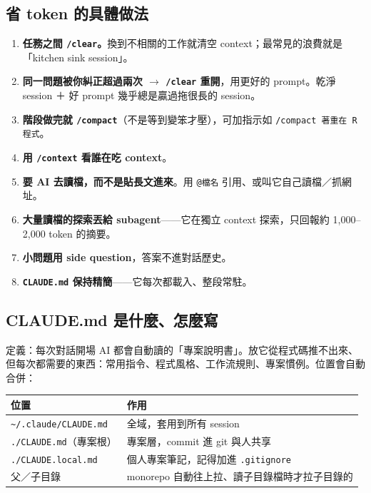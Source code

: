 \documentclass[12pt, a4paper]{article}
\begin{document}
\subsection{省 token 的具體做法}

\begin{enumerate}
  \item \textbf{任務之間 \texttt{/clear}。}換到不相關的工作就清空 context；最常見的浪費就是「kitchen sink session」。
  \item \textbf{同一問題被你糾正超過兩次 $\rightarrow$ \texttt{/clear} 重開}，用更好的 prompt。乾淨 session ＋ 好 prompt 幾乎總是贏過拖很長的 session。
  \item \textbf{階段做完就 \texttt{/compact}}（不是等到變笨才壓），可加指示如 \texttt{/compact 著重在 R 程式}。
  \item \textbf{用 \texttt{/context} 看誰在吃 context}。
  \item \textbf{要 AI 去讀檔，而不是貼長文進來}。用 \texttt{@檔名} 引用、或叫它自己讀檔／抓網址。
  \item \textbf{大量讀檔的探索丟給 subagent}——它在獨立 context 探索，只回報約 1{,}000--2{,}000 token 的摘要。
  \item \textbf{小問題用 side question}，答案不進對話歷史。
  \item \textbf{\texttt{CLAUDE.md} 保持精簡}——它每次都載入、整段常駐。
\end{enumerate}

\subsection{CLAUDE.md 是什麼、怎麼寫}

定義：每次對話開場 AI 都會自動讀的「專案說明書」。放它從程式碼推不出來、但每次都需要的東西：常用指令、程式風格、工作流規則、專案慣例。位置會自動合併：

\begin{table}[h]
\centering
\begin{tabularx}{\linewidth}{lY}
\toprule
位置 & 作用 \\
\midrule
\texttt{\textasciitilde/.claude/CLAUDE.md} & 全域，套用到所有 session \\
\texttt{./CLAUDE.md}（專案根） & 專案層，commit 進 git 與人共享 \\
\texttt{./CLAUDE.local.md} & 個人專案筆記，記得加進 \texttt{.gitignore} \\
父／子目錄 & monorepo 自動往上拉、讀子目錄檔時才拉子目錄的 \\
\bottomrule
\end{tabularx}
\end{table}
\end{document}
